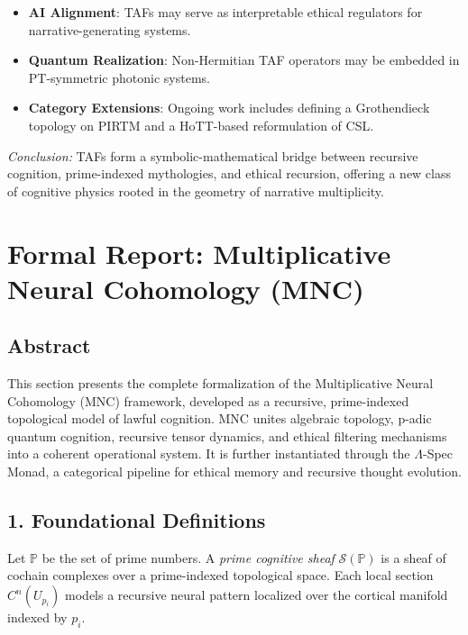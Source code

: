 \documentclass{article}
\theoremstyle{plain}
\begin{document}
\begin{itemize}
  \item \textbf{AI Alignment}: TAFs may serve as interpretable ethical regulators for narrative-generating systems.
  \item \textbf{Quantum Realization}: Non-Hermitian TAF operators may be embedded in PT-symmetric photonic systems.
  \item \textbf{Category Extensions}: Ongoing work includes defining a Grothendieck topology on PIRTM and a HoTT-based reformulation of CSL.
\end{itemize}

\textit{Conclusion:} TAFs form a symbolic-mathematical bridge between recursive cognition, prime-indexed mythologies, and ethical recursion, offering a new class of cognitive physics rooted in the geometry of narrative multiplicity.


\section{Formal Report: Multiplicative Neural Cohomology (MNC)}

\subsection{Abstract}
This section presents the complete formalization of the Multiplicative Neural Cohomology (MNC) framework, developed as a recursive, prime-indexed topological model of lawful cognition. MNC unites algebraic topology, p-adic quantum cognition, recursive tensor dynamics, and ethical filtering mechanisms into a coherent operational system. It is further instantiated through the $\Lambda$-Spec Monad, a categorical pipeline for ethical memory and recursive thought evolution.

\subsection{1. Foundational Definitions}

\begin{definition}
Let $\mathbb{P}$ be the set of prime numbers. A \emph{prime cognitive sheaf} $\mathcal{S}(\mathbb{P})$ is a sheaf of cochain complexes over a prime-indexed topological space. Each local section $C^n(U_{p_i})$ models a recursive neural pattern localized over the cortical manifold indexed by $p_i$.
\end{definition}
\end{document}

